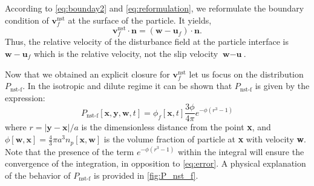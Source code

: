 According to \ref{eq:bounday2} and \ref{eq:reformulation}, we reformulate the boundary condition of $\textbf{v}^\text{nst}_f$ at the surface of the particle. 
It yields, 
\begin{equation*}
    \textbf{v}^\text{nst}_f\cdot \textbf{n}
    = \left(
        \textbf{w} - \textbf{u}_f
    \right)\cdot \textbf{n}.
\end{equation*}
Thus, the relative velocity of the disturbance field  at the particle interface is $\textbf{w} - \textbf{u}_f$ which is the relative velocity, not the slip velocity $\textbf{w} - \textbf{u}$. 

Now that we obtained an explicit closure for $\textbf{v}^\text{nst}_f$ let us focus 
on the distribution $P_\text{nst-f}$. 
In the isotropic and dilute regime it can be shown that $P_\text{nst-f}$ is given by the expression\citep{zhang2021ensemble}: 
\begin{equation}
    P_\text{nst-f}[\textbf{x},\textbf{y},\textbf{w},t]
    = \phi_f[\textbf{x},t] \frac{3\phi}{4\pi} e^{-\phi(r^3 -1)}
    \label{eq:Pnst_explicit}
\end{equation} 
where $r = |\textbf{y} - \textbf{x}|/a$ is the dimensionless distance from the point \textbf{x},  and $\phi[\textbf{w},\textbf{x}] = \frac{4}{3}\pi a^3 n_p[\textbf{x},\textbf{w}]$ is the volume fraction of particle at \textbf{x} with velocity \textbf{w}. 
Note that the presence of the term $e^{-\phi(r^3 -1)}$ within the integral will ensure the convergence of the integration, in opposition to \ref{eq:error}. 
A physical explanation of the behavior of $P_\text{nst-f}$ is provided in \ref{fig:P_nst_f}. 
